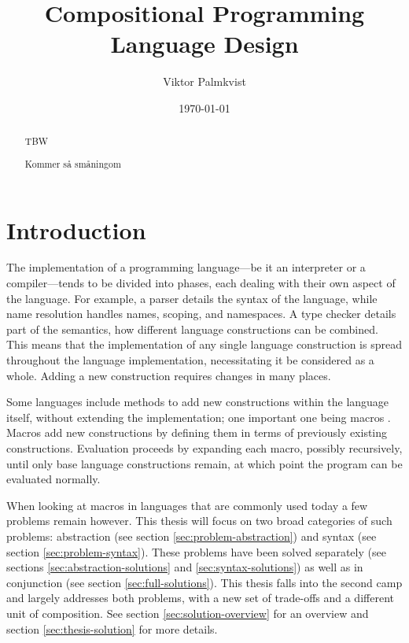 \documentclass{kththesis}
\title{Compositional Programming Language Design}
\author{Viktor Palmkvist}
\date{\today}
\begin{document}
\frontmatter

\titlepage

\begin{abstract}
TBW
\end{abstract}


\begin{otherlanguage}{swedish}
\begin{abstract}
Kommer så småningom
\end{abstract}
\end{otherlanguage}


\tableofcontents


\mainmatter


\chapter{Introduction} \label{sec:introduction}

The implementation of a programming language---be it an interpreter or a compiler---tends to be divided into phases, each dealing with their own aspect of the language. For example, a parser details the syntax of the language, while name resolution handles names, scoping, and namespaces. A type checker details part of the semantics, how different language constructions can be combined. This means that the implementation of any single language construction is spread throughout the language implementation, necessitating it be considered as a whole. Adding a new construction requires changes in many places.

Some languages include methods to add new constructions within the language itself, without extending the implementation; one important one being macros \cite{plt-tr1,Hickey2008,Matsakis2014}. Macros add new constructions by defining them in terms of previously existing constructions. Evaluation proceeds by expanding each macro, possibly recursively, until only base language constructions remain, at which point the program can be evaluated normally.

When looking at macros in languages that are commonly used today a few problems remain however. This thesis will focus on two broad categories of such problems: abstraction (see section \ref{sec:problem-abstraction}) and syntax (see section \ref{sec:problem-syntax}). These problems have been solved separately (see sections \ref{sec:abstraction-solutions} and \ref{sec:syntax-solutions}) as well as in conjunction (see section \ref{sec:full-solutions}). This thesis falls into the second camp and largely addresses both problems, with a new set of trade-offs and a different unit of composition. See section \ref{sec:solution-overview} for an overview and section \ref{sec:thesis-solution} for more details.
\end{document}

